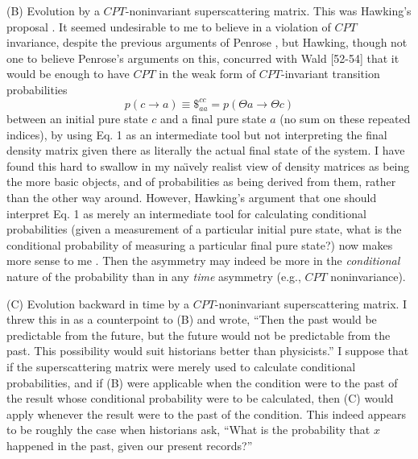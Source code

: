      (B) Evolution by a $CPT$-noninvariant superscattering matrix.
This was
Hawking's proposal \cite{Haw76}.  It seemed undesirable to me to
believe in a
violation of $CPT$ invariance, despite the previous arguments of
Penrose
\cite{Pen79}, but Hawking, though not one to believe Penrose's
arguments on
this, concurred \cite{Haw80pri} with Wald [52-54] that it
would be enough to have $CPT$ in the weak form of $CPT$-invariant
transition
probabilities
     	\begin{equation}
	p(c\rightarrow a)\equiv\$_{aa}^{cc}=p(\Theta
a\rightarrow\Theta c)
	\end{equation}
between an initial pure state $c$ and a final pure state $a$
(no sum on these repeated indices), by using Eq. 1 as
an intermediate tool but not interpreting the final density matrix
given there
as literally the actual final state of the system.  I have found this
hard to
swallow in my na\"{\i}vely realist view of density matrices as being
the more
basic objects, and of probabilities as being derived from them,
rather than the
other way around.  However, Hawking's argument \cite{Haw82}  that one
should interpret Eq. 1 as merely an intermediate
tool for calculating conditional probabilities (given a measurement
of a
particular initial pure state, what is the conditional probability of
measuring
a particular final pure state?) now makes more sense to me
\cite{Pag93notime}.  Then the asymmetry may indeed be more in the
{\it
conditional} nature of the probability than in any {\it time}
asymmetry (e.g.,
$CPT$ noninvariance).

     (C) Evolution backward in time by a $CPT$-noninvariant
superscattering
matrix.  I threw this in as a counterpoint to (B) and wrote, ``Then
the past
would be predictable from the future, but the future would not be
predictable
from the past.  This possibility would suit historians better than
physicists.''
 I suppose that if the superscattering matrix were merely used to
calculate
conditional probabilities, and if (B) were applicable when the
condition were
to the past of the result whose conditional probability were to be
calculated,
then (C) would apply whenever the result were to the past of the
condition.
This indeed appears to be roughly the case when historians ask,
``What is the
probability that $x$ happened in the past, given our present
records?''

